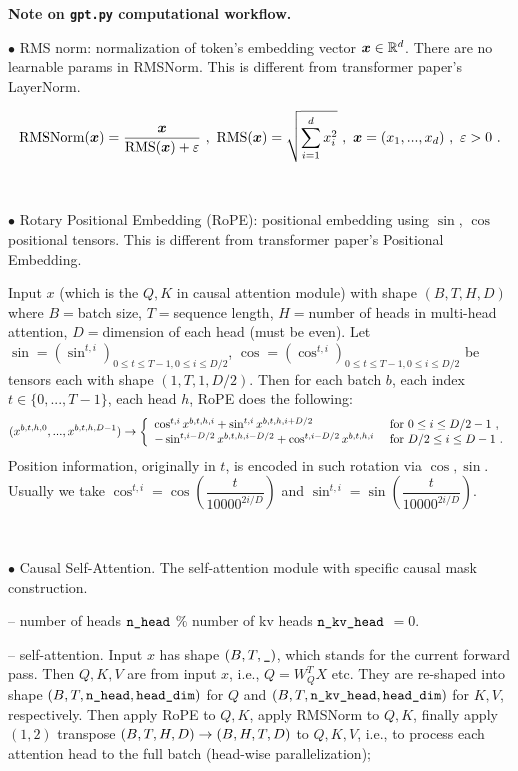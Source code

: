 \documentclass[a4paper,11pt]{article}
\numberwithin{equation}{section}
\begin{document}
\begin{center}
\large{\textbf{Note on \verb~gpt.py~ computational workflow.}}
\end{center}


$\bullet$ RMS norm: normalization of token's embedding vector $\boldsymbol{x} \in \mathbb{R}^d$. There are no learnable params in RMSNorm. This is different from transformer paper's LayerNorm.

$$\text{RMSNorm}(\boldsymbol{x})=\dfrac{\boldsymbol{x}}{\text{RMS}(\boldsymbol{x})+\varepsilon} \ , \ \text{RMS}(\boldsymbol{x})=\sqrt{\sum\limits_{i=1}^d x_i^2} \ , \ \boldsymbol{x} = (x_1,...,x_d) \ , \ \varepsilon>0 \ .$$

\

$\bullet$ Rotary Positional Embedding (RoPE): positional embedding using $\sin$, $\cos$ positional tensors. This is different from transformer paper's Positional Embedding.

Input $x$ (which is the $Q,K$ in causal attention module) with shape $(B, T, H, D)$ where  $B=$batch size, $T=$sequence length, $H=$number of heads in multi-head attention, $D=$dimension of each head (must be even). Let $\sin=(\sin^{t,i})_{0\leq t \leq T-1, 0\leq i\leq D/2}$, $\cos=(\cos^{t,i})_{0\leq t \leq T-1, 0\leq i\leq D/2}$ be tensors each with shape $(1,T,1,D/2)$. Then for each batch $b$, each index $t\in \{0,...,T-1\}$, each head $h$, RoPE does the following:
$$(x^{b,t,h,0},...,x^{b,t,h,D-1}) \rightarrow \left\{\begin{array}{ll}
\cos^{t,i}x^{b,t,h,i} + \sin^{t,i}x^{b,t,h,i+D/2} & \text{ for } 0\leq i \leq D/2-1 \ ,
\\
-\sin^{t,i-D/2}x^{b,t,h,i-D/2} + \cos^{t,i-D/2}x^{b,t,h,i} & \text{ for } D/2\leq i \leq D-1 \ .
\end{array}\right.$$
Position information, originally in $t$, is encoded in such rotation via $\cos, \sin$. Usually we take $\cos^{t,i}=\cos \left(\dfrac{t}{10000^{2i/D}}\right)$ and $\sin^{t,i}=\sin \left(\dfrac{t}{10000^{2i/D}}\right)$.

\

$\bullet$ Causal Self-Attention. The self-attention module with specific causal mask construction.

-- number of heads $\verb#n_head#$ $\%$ number of kv heads $\verb#n_kv_head#$ $=0$. 

-- self-attention. Input $x$ has shape $(B,T,\verb#_#)$, which stands for the current forward pass. Then $Q, K, V$ are from input $x$, i.e., $Q=W_Q^T X$ etc. They are re-shaped into shape $(B,T, \verb#n_head#, \verb#head_dim#)$ for $Q$ and $(B,T, \verb#n_kv_head#, \verb#head_dim#)$ for $K, V$, respectively. 
Then apply RoPE to $Q,K$, apply RMSNorm to $Q,K$, finally apply $(1,2)$ transpose $(B,T,H,D)\rightarrow (B,H,T,D)$ to $Q,K,V$, i.e., to process each attention head to the full batch (head-wise parallelization);
\end{document}
